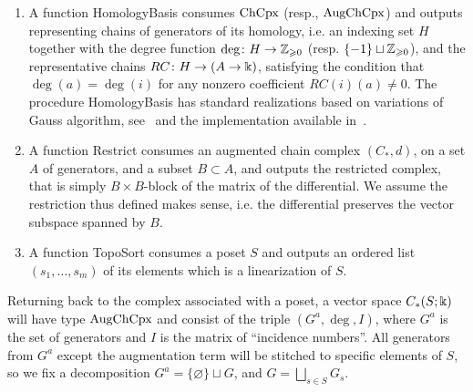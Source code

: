 \begin{enumerate}
  \item A function HomologyBasis consumes $\operatorname{ChCpx}$ (resp., $\operatorname{AugChCpx}$) and outputs representing chains of generators of its homology, i.e. an indexing set $H$ together with the degree function $\deg\colon H\to \mathbb{Z}_{\geqslant 0}$ (resp. $\{-1\}\sqcup\mathbb{Z}_{\geqslant 0}$), and the representative chains $RC\colon H\to (A\to \Bbbk)$, satisfying the condition that $\deg(a)=\deg(i)$ for any nonzero coefficient $RC(i)(a)\neq 0$. The procedure HomologyBasis has standard realizations based on variations of Gauss algorithm, see~\cite{KACZYNSKI199859} and the implementation available in~\cite{Sage}.%
  \item A function Restrict consumes an augmented chain complex $(C_*,d)$, on a set $A$ of generators, and a subset $B\subset A$, and outputs the restricted complex, that is simply $B\times B$-block of the matrix of the differential. We assume the restriction thus defined makes sense, i.e. the differential preserves the vector subspace spanned by $B$.
  \item A function TopoSort consumes a poset $S$ and outputs an ordered list $(s_1,\ldots,s_m)$ of its elements which is a linearization of $S$.
\end{enumerate}

Returning back to the complex associated with a poset, a vector space $C_*(S;\Bbbk)$ will have type $\operatorname{AugChCpx}$ and consist of the triple $(G^a,\deg,I)$, where $G^a$ is the set of generators and $I$ is the matrix of ``incidence numbers''. All generators from $G^a$ except the augmentation term will be stitched to specific elements of $S$, so we fix a decomposition $G^a=\{\varnothing\}\sqcup G$, and $G=\bigsqcup_{s\in S}G_s$.
%

